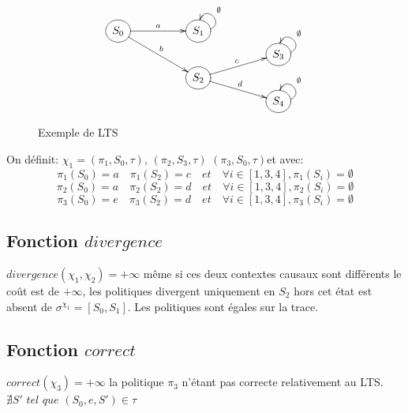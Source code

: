 \documentclass[11pt]{extarticle}
\begin{document}
\begin{figure}[h!]
    \centering
    \[
        \xymatrix @R=0.1em@C=5em {
        *++[o][F-]{S_0} \ar[r]^{a} \ar[rdd]^b & *++[o][F-]{S_1} \ar@(r,u)[]_{\emptyset}
        \\ & & *++[o][F-]{S_3} \ar@(r,u)[]_{\emptyset}
        \\ & *++[o][F-]{S_2} \ar[ru]^c \ar[rd]^d &
         \\ & & *++[o][F-]{S_4} \ar@(r,u)[]_{\emptyset}
        }    
    \]
    \caption{Exemple de LTS}
    \label{fig:placeholder}
\end{figure}

On définit:
$\chi_1 = (\pi_1,S_0,\tau)$, $(\pi_2,S_3,\tau)$ $(\pi_3,S_0,\tau)$et  avec: 
$$\pi_1(S_0) = a \quad \pi_1(S_2)=c \quad et \quad \forall i\in[1,3,4],\pi_1(S_i)= \emptyset$$
$$\pi_2(S_0) = a \quad \pi_2(S_2)=d \quad et \quad \forall i\in[1,3,4],\pi_2(S_i)= \emptyset$$
$$\pi_3(S_0) = e \quad \pi_3(S_2)=d \quad et \quad \forall i\in[1,3,4],\pi_3(S_i)= \emptyset$$



\subsection{Fonction $divergence$}\label{ex_div}

$divergence(\chi_1,\chi_2)= +\infty$ même si ces deux contextes causaux sont différents le coût est de $+\infty$, les politiques divergent uniquement en $S_2$ hors cet état est absent de $\sigma^{\chi_1}=[S_0,S_1]$. Les politiques sont égales sur la trace.

\subsection{Fonction $correct$}\label{ex_corr}
$correct(\chi_3) = +\infty$ la politique $\pi_3$ n'étant pas correcte relativement au LTS. $\nexists S' \textit{ tel que } (S_0,e,S')\in \tau$
\end{document}
